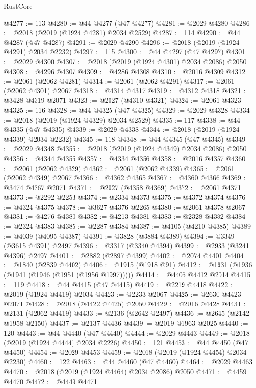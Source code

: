\begin{lexlean}{RustCore}
\begin{coremodule}
@4277 := 113
@4280 := @44 @4277 (@47 @4277)
@4281 := @2029 @4280
@4286 := @2018 (@2019 (@1924 @4281) @2034 @2529)
@4287 := 114
@4290 := @44 @4287 (@47 @4287)
@4291 := @2029 @4290
@4296 := @2018 (@2019 (@1924 @4291) @2034 @2232)
@4297 := 115
@4300 := @44 @4297 (@47 @4297)
@4301 := @2029 @4300
@4307 := @2018 (@2019 (@1924 @4301) @2034 @2086) @2050
@4308 := @4296 @4307
@4309 := @4286 @4308
@4310 := @2016 @4309
@4312 := @2061 (@2062 @4281)
@4314 := @2061 (@2062 @4291)
@4317 := @2061 (@2062 @4301) @2067
@4318 := @4314 @4317
@4319 := @4312 @4318
@4321 := @3428 @4319 @2071
@4323 := @2027 (@4310 @4321)
@4324 := @2061 @4323
@4325 := 116
@4328 := @44 @4325 (@47 @4325)
@4329 := @2029 @4328
@4334 := @2018 (@2019 (@1924 @4329) @2034 @2529)
@4335 := 117
@4338 := @44 @4335 (@47 @4335)
@4339 := @2029 @4338
@4344 := @2018 (@2019 (@1924 @4339) @2034 @2232)
@4345 := 118
@4348 := @44 @4345 (@47 @4345)
@4349 := @2029 @4348
@4355 := @2018 (@2019 (@1924 @4349) @2034 @2086) @2050
@4356 := @4344 @4355
@4357 := @4334 @4356
@4358 := @2016 @4357
@4360 := @2061 (@2062 @4329)
@4362 := @2061 (@2062 @4339)
@4365 := @2061 (@2062 @4349) @2067
@4366 := @4362 @4365
@4367 := @4360 @4366
@4369 := @3474 @4367 @2071
@4371 := @2027 (@4358 @4369)
@4372 := @2061 @4371
@4373 := @2292 @2253
@4374 := @2334 @4373
@4375 := @4372 @4374
@4376 := @4324 @4375
@4378 := @3627 @4376 @2265
@4380 := @2061 @4378 @2067
@4381 := @4276 @4380
@4382 := @4213 @4381
@4383 := @2328 @4382
@4384 := @2324 @4383
@4385 := @2287 @4384
@4387 := @4105 (@4210 @4385)
@4389 := @4039 (@4095 @4387)
@4391 := @3828 (@3884 @4389)
@4394 := @3349 (@3615 @4391) @2497
@4396 := @3317 (@3340 @4394)
@4399 := @2933 (@3241 @4396) @2497
@4401 := @2882 (@2897 @4399)
@4402 := @2074 @4401
@4404 := @1840 (@2839 @4402)
@4406 := @1915 (@1918 @91)
@4412 := @1931 (@1936 (@1941 (@1946 (@1951 (@1956 @1997)))))
@4414 := @4406 @4412 @2014
@4415 := 119
@4418 := @44 @4415 (@47 @4415)
@4419 := @2219 @4418
@4422 := @2019 (@1924 @4419) @2034
@4423 := @2233 @2067
@4425 := @2630 @4423 @2071
@4428 := @2018 (@4422 @4425) @2050
@4429 := @2016 @4428
@4431 := @2131 (@2062 @4419)
@4433 := @2136 (@2642 @2497)
@4436 := @2645 (@2142 @1958 @2150)
@4437 := @2137 @4436
@4439 := @2019 @1963 @2025
@4440 := 120
@4443 := @44 @4440 (@47 @4440)
@4444 := @2029 @4443
@4449 := @2018 (@2019 (@1924 @4444) @2034 @2226)
@4450 := 121
@4453 := @44 @4450 (@47 @4450)
@4454 := @2029 @4453
@4459 := @2018 (@2019 (@1924 @4454) @2034 @2230)
@4460 := 122
@4463 := @44 @4460 (@47 @4460)
@4464 := @2029 @4463
@4470 := @2018 (@2019 (@1924 @4464) @2034 @2086) @2050
@4471 := @4459 @4470
@4472 := @4449 @4471

\end{coremodule}
\end{lexlean}
